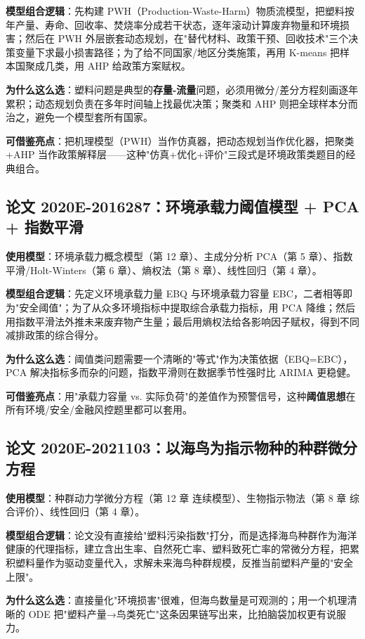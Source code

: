 \textbf{模型组合逻辑}：先构建 PWH（Production-Waste-Harm）物质流模型，把塑料按年产量、寿命、回收率、焚烧率分成若干状态，逐年滚动计算废弃物量和环境损害；然后在 PWH 外层嵌套动态规划，在"替代材料、政策干预、回收技术"三个决策变量下求最小损害路径；为了给不同国家/地区分类施策，再用 K-means 把样本国聚成几类，用 AHP 给政策方案赋权。

\textbf{为什么这么选}：塑料问题是典型的\textbf{存量-流量}问题，必须用微分/差分方程刻画逐年累积；动态规划负责在多年时间轴上找最优决策；聚类和 AHP 则把全球样本分而治之，避免一个模型套所有国家。

\textbf{可借鉴亮点}：把机理模型（PWH）当作仿真器，把动态规划当作优化器，把聚类+AHP 当作政策解释层——这种"仿真+优化+评价"三段式是环境政策类题目的经典组合。

\subsection{论文 2020E-2016287：环境承载力阈值模型 + PCA + 指数平滑}
\textbf{使用模型}：环境承载力概念模型（第 12 章）、主成分分析 PCA（第 5 章）、指数平滑/Holt-Winters（第 6 章）、熵权法（第 8 章）、线性回归（第 4 章）。

\textbf{模型组合逻辑}：先定义环境承载力量 EBQ 与环境承载力容量 EBC，二者相等即为"安全阈值"；为了从众多环境指标中提取综合承载力指标，用 PCA 降维；然后用指数平滑法外推未来废弃物产生量；最后用熵权法给各影响因子赋权，得到不同减排政策的综合得分。

\textbf{为什么这么选}：阈值类问题需要一个清晰的"等式"作为决策依据（EBQ=EBC），PCA 解决指标多而杂的问题，指数平滑则在数据季节性强时比 ARIMA 更稳健。

\textbf{可借鉴亮点}：用"承载力容量 vs. 实际负荷"的差值作为预警信号，这种\textbf{阈值思想}在所有环境/安全/金融风控题里都可以套用。

\subsection{论文 2020E-2021103：以海鸟为指示物种的种群微分方程}
\textbf{使用模型}：种群动力学微分方程（第 12 章 连续模型）、生物指示物法（第 8 章 综合评价）、线性回归（第 4 章）。

\textbf{模型组合逻辑}：论文没有直接给"塑料污染指数"打分，而是选择海鸟种群作为海洋健康的代理指标，建立含出生率、自然死亡率、塑料致死亡率的常微分方程，把累积塑料量作为驱动变量代入，求解未来海鸟种群规模，反推当前塑料产量的"安全上限"。

\textbf{为什么这么选}：直接量化"环境损害"很难，但海鸟数量是可观测的；用一个机理清晰的 ODE 把"塑料产量→鸟类死亡"这条因果链写出来，比拍脑袋加权更有说服力。

